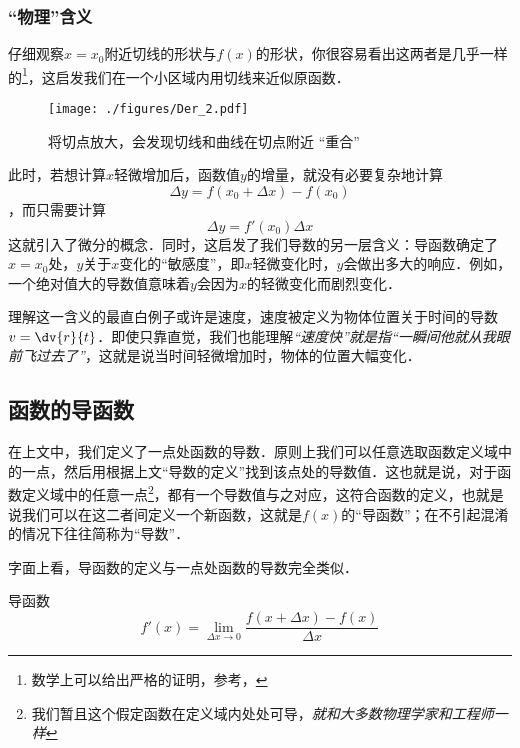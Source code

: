 \subsubsection{“物理”含义}
仔细观察$x=x_0$附近切线的形状与$f(x)$的形状，你很容易看出这两者是几乎一样的\footnote{数学上可以给出严格的证明，参考\cite{同济高}，\cite{Thomas}}，这启发我们在一个小区域内用切线来近似原函数．

\begin{figure}[ht]
\centering
\texttt{[image: ./figures/Der\_2.pdf]}
\caption{将切点放大，会发现切线和曲线在切点附近 “重合”}
\end{figure}

此时，若想计算$x$轻微增加后，函数值$y$的增量，就没有必要复杂地计算
$$\Delta y = f(x_0+\Delta x) - f(x_0)$$
，而只需要计算
\begin{equation}
\Delta y = f'(x_0) \Delta x
\end{equation}
这就引入了微分的概念．同时，这启发了我们导数的另一层含义：导函数确定了$x=x_0$处，$y$关于$x$变化的“敏感度”，即$x$轻微变化时，$y$会做出多大的响应．例如，一个绝对值大的导数值意味着$y$会因为$x$的轻微变化而剧烈变化．

理解这一含义的最直白例子或许是速度，速度被定义为物体位置关于时间的导数$v=\dv{r}{t}$．即使只靠直觉，我们也能理解\textsl{“速度快”就是指“一瞬间他就从我眼前飞过去了”}，这就是说当时间轻微增加时，物体的位置大幅变化．

\subsection{函数的导函数}
在上文中，我们定义了一点处函数的导数．原则上我们可以任意选取函数定义域中的一点，然后用根据上文“导数的定义”找到该点处的导数值．这也就是说，对于函数定义域中的任意一点\footnote{我们暂且这个假定函数在定义域内处处可导，\textsl{就和大多数物理学家和工程师一样}}，都有一个导数值与之对应，这符合函数的定义，也就是说我们可以在这二者间定义一个新函数，这就是$f(x)$的“导函数”；在不引起混淆的情况下往往简称为“导数”．

字面上看，导函数的定义与一点处函数的导数完全类似．
\begin{definition}{导函数}
\begin{equation}
f'(x)=\lim_{\Delta x\to0}\frac{f(x+\Delta x)-f(x)}{\Delta x}
\end{equation}
\end{definition}

